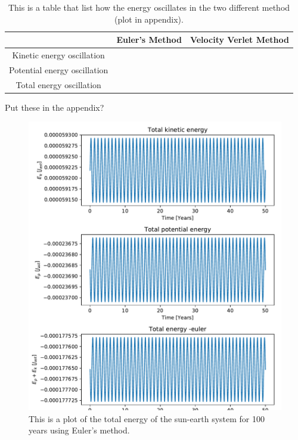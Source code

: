 \begin{table}[H]\caption{This is a table that list how the energy oscillates in the two different method (plot in appendix).}\label{tab:energy_oscillations}
\begin{tabular}{ccc}
 & Euler's Method & Velocity Verlet Method\\ \hline
Kinetic energy oscillation & & \\
Potential energy oscillation & & \\
Total energy oscillation & & \\
\end{tabular}
\end{table}

Put these in the appendix?

\begin{figure}[H]
\includegraphics[width=1.1\linewidth]{../results/plots/totalenergy-euler.pdf}\caption{This is a plot of the total energy of the sun-earth system for 100 years using Euler's method.}\label{fig:totalenergy-euler}
\end{figure}	

